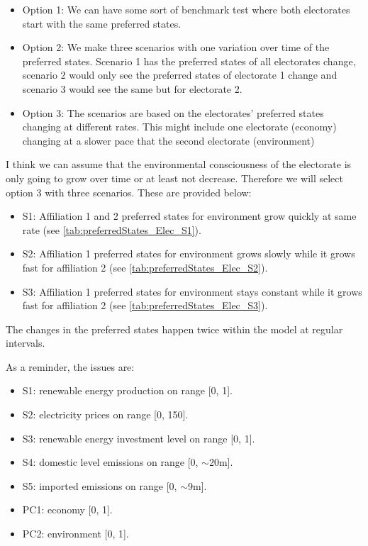 \begin{itemize}
\item Option 1: We can have some sort of benchmark test where both electorates start with the same preferred states.
\item Option 2: We make three scenarios with one variation over time of the preferred states. Scenario 1 has the preferred states of all electorates change, scenario 2 would only see the preferred states of electorate 1 change and scenario 3 would see the same but for electorate 2.
\item Option 3: The scenarios are based on the electorates' preferred states changing at different rates. This might include one electorate (economy) changing at a slower pace that the second electorate (environment)
\end{itemize}

I think we can assume that the environmental consciousness of the electorate is only going to grow over time or at least not decrease. Therefore we will select option 3 with three scenarios. These are provided below:

\begin{itemize}
\item S1: Affiliation 1 and 2 preferred states for environment grow quickly at same rate (see \autoref{tab:preferredStates_Elec_S1}).
\item S2: Affiliation 1 preferred states for environment grows slowly while it grows fast for affiliation 2 (see \autoref{tab:preferredStates_Elec_S2}).
\item S3: Affiliation 1 preferred states for environment stays constant while it grows fast for affiliation 2 (see \autoref{tab:preferredStates_Elec_S3}).
\end{itemize}

The changes in the preferred states happen twice within the model at regular intervals.

As a reminder, the issues are: 

\begin{itemize}
\item S1: renewable energy production on range [0, 1].
\item S2: electricity prices on range [0, 150]. %
\item S3: renewable energy investment level on range [0, 1].
\item S4: domestic level emissions on range [0, $\sim$20m].
\item S5: imported emissions on range [0, $\sim$9m]. %
\item PC1: economy [0, 1]. %
\item PC2: environment [0, 1]. %
\end{itemize}

